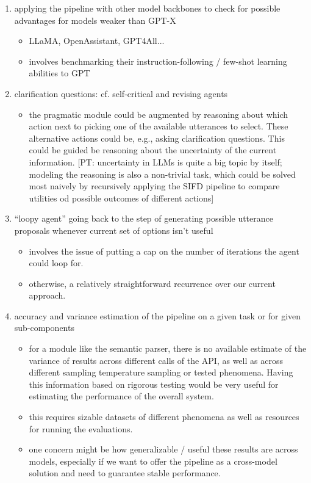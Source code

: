 \documentclass[fleqn,reqno,10pt]{article}
\newcommand{\pt}[1]{\textcolor{CSP-accent-1}{[PT: #1]}}
\begin{document}
\begin{enumerate}
\begin{itemize}
        \end{itemize}
    \item applying the pipeline with other model backbones to check for possible advantages for models weaker than GPT-X
        \begin{itemize}
            \item LLaMA, OpenAssistant, GPT4All...
            \item involves benchmarking their instruction-following / few-shot learning abilities to GPT
        \end{itemize}
    \item clarification questions: cf. self-critical and revising agents
    \begin{itemize}
        \item the pragmatic module could be augmented by reasoning about which action next to picking one of the available utterances to select. These alternative actions could be, e.g., asking clarification questions. This could be guided be reasoning about the uncertainty of the current information. \pt{uncertainty in LLMs is quite a big topic by itself; modeling the reasoning is also a non-trivial task, which could be solved most naively by recursively applying the SIFD pipeline to compare utilities od possible outcomes of different actions}
    \end{itemize}
    \item ``loopy agent'' going back to the step of generating possible utterance proposals whenever current set of options isn't useful
    \begin{itemize}
        \item involves the issue of putting a cap on the number of iterations the agent could loop for.
        \item otherwise, a relatively straightforward recurrence over our current approach.
    \end{itemize}
    \item accuracy and variance estimation of the pipeline on a given task or for given sub-components
    \begin{itemize}
        \item for a module like the semantic parser, there is no available estimate of the variance of results across different calls of the API, as well as across different sampling temperature sampling or tested phenomena. Having this information based on rigorous testing would be very useful for estimating the performance of the overall system.
        \item this requires sizable datasets of different phenomena as well as resources for running the evaluations.
        \item one concern might be how generalizable / useful these results are across models, especially if we want to offer the pipeline as a cross-model solution and need to guarantee stable performance.
    \end{itemize}
\end{enumerate}


\printbibliography[heading=bibintoc]
\end{document}
